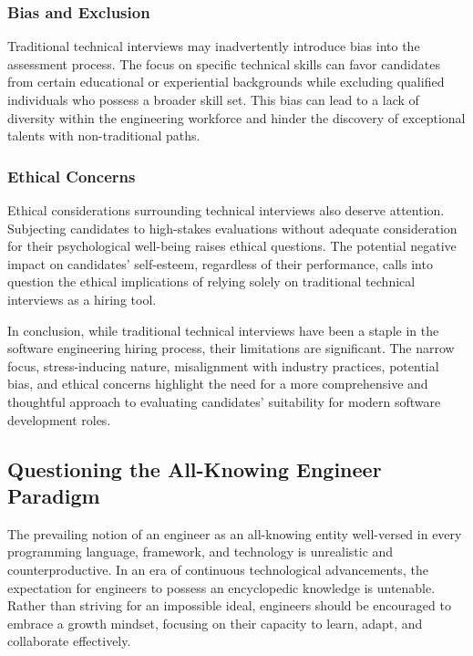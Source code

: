 \documentclass[
    a4paper, %
    10pt, %
    unnumberedsections, %
    twoside, %
]{LTJournalArticle}
\begin{document}
\subsubsection*{Bias and Exclusion}

Traditional technical interviews may inadvertently introduce bias into the assessment process. The focus on specific technical skills can favor candidates from certain educational or experiential backgrounds while excluding qualified individuals who possess a broader skill set. This bias can lead to a lack of diversity within the engineering workforce and hinder the discovery of exceptional talents with non-traditional paths.

\subsubsection*{Ethical Concerns}

Ethical considerations surrounding technical interviews also deserve attention. Subjecting candidates to high-stakes evaluations without adequate consideration for their psychological well-being raises ethical questions. The potential negative impact on candidates' self-esteem, regardless of their performance, calls into question the ethical implications of relying solely on traditional technical interviews as a hiring tool.

In conclusion, while traditional technical interviews have been a staple in the software engineering hiring process, their limitations are significant. The narrow focus, stress-inducing nature, misalignment with industry practices, potential bias, and ethical concerns highlight the need for a more comprehensive and thoughtful approach to evaluating candidates' suitability for modern software development roles.



\subsection{Questioning the All-Knowing Engineer Paradigm}

The prevailing notion of an engineer as an all-knowing entity well-versed in every programming language, framework, and technology is unrealistic and counterproductive. In an era of continuous technological advancements, the expectation for engineers to possess an encyclopedic knowledge is untenable. Rather than striving for an impossible ideal, engineers should be encouraged to embrace a growth mindset, focusing on their capacity to learn, adapt, and collaborate effectively.
\end{document}
